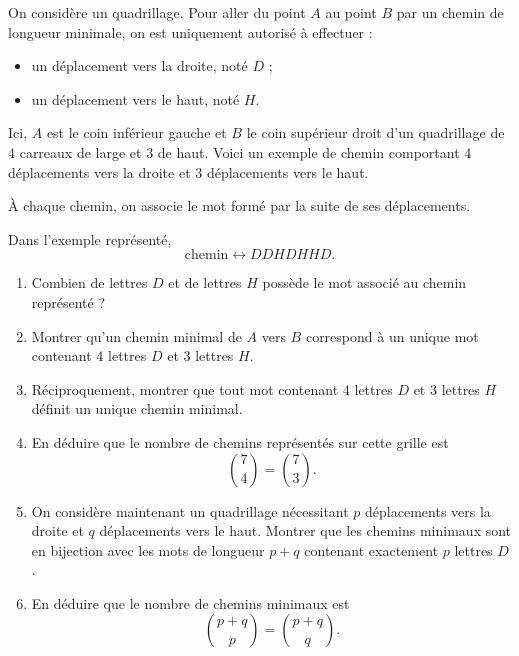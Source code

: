 On considère un quadrillage. Pour aller du point $A$ au point $B$ par un
chemin de longueur minimale, on est uniquement autorisé à effectuer :
\begin{itemize}
  \item un déplacement vers la droite, noté $D$ ;
  \item un déplacement vers le haut, noté $H$.
\end{itemize}
Ici, $A$ est le coin inférieur gauche et $B$ le coin supérieur droit d'un
quadrillage de $4$ carreaux de large et $3$ de haut. Voici un exemple de
chemin comportant $4$ déplacements vers la droite et $3$ déplacements vers
le haut.

\begin{center}
\end{center}

À chaque chemin, on associe le mot formé par la suite de ses déplacements.

Dans l'exemple représenté,
\[
\text{chemin} \longleftrightarrow DDHDHHD.
\]
\begin{enumerate}
  \item Combien de lettres $D$ et de lettres $H$ possède le mot associé au
  chemin représenté ?
  \item Montrer qu'un chemin minimal de $A$ vers $B$ correspond à un unique
  mot contenant $4$ lettres $D$ et $3$ lettres $H$.
  \item Réciproquement, montrer que tout mot contenant $4$ lettres $D$ et $3$
  lettres $H$ définit un unique chemin minimal.
  \item En déduire que le nombre de chemins représentés sur cette grille est
  \[
  \binom{7}{4} = \binom{7}{3}.
  \]
  \item On considère maintenant un quadrillage nécessitant $p$ déplacements
  vers la droite et $q$ déplacements vers le haut. Montrer que les chemins
  minimaux sont en bijection avec les mots de longueur $p + q$ contenant
  exactement $p$ lettres $D$.
  \item En déduire que le nombre de chemins minimaux est
  \[
  \binom{p+q}{p} = \binom{p+q}{q}.
  \]
\end{enumerate}
